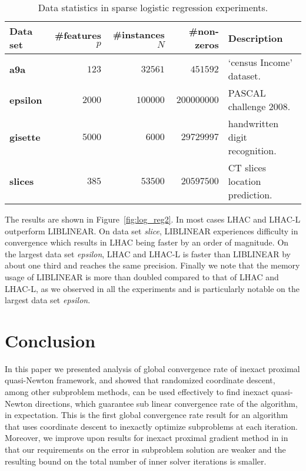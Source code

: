 \documentclass[11pt]{article}
\numberwithin{equation}{section}
\begin{document}
\begin{table}[h!]
\begin{center}
\begin{tabular}{|l|r|r|r|p{5cm}|}
    \hline
              \textbf{Data set}    & \#features $p$ & \#instances $N$ & \#non-zeros & Description \\
    \hline
        \textbf{a9a} &  $123$ & $32561$ & $451592$   & `census Income' dataset. \\
    \hline        
        \textbf{epsilon} &  $2000$ & $100000$ & $200000000$   &  PASCAL challenge 2008. \\
    \hline    
        \textbf{gisette} &  $5000$ & $6000$ & $29729997$  & handwritten digit recognition. \\
    \hline        
        \textbf{slices} &  $385$ & $53500$ & $20597500$   &  CT slices location prediction.\\   
    \hline
\end{tabular}
\end{center}
\caption{ Data statistics in sparse logistic regression experiments. }
\label{tab:Data_statistics}
\end{table}


The results are shown in Figure~\ref{fig:log_reg2}. In most cases LHAC and LHAC-L outperform LIBLINEAR. 
On data set \emph{slice}, LIBLINEAR experiences difficulty in convergence which results in LHAC being faster by an order of magnitude.  
On the largest data set \emph{epsilon}, LHAC and LHAC-L is faster than LIBLINEAR by about one third and reaches the same precision. Finally we note that the memory usage of LIBLINEAR is more than doubled compared to that of LHAC and LHAC-L, as we observed in all the experiments and is particularly notable on  the largest data set \emph{epsilon}.



\section{Conclusion} In this paper we presented analysis of global convergence rate of inexact proximal quasi-Newton framework, and showed that randomized coordinate descent, among other subproblem methods,  can be used effectively to find inexact quasi-Newton directions, which guarantee sub linear convergence rate of the algorithm, in expectation. This is the first global convergence rate result for an algorithm that uses coordinate descent to inexactly optimize subproblems at each iteration. Moreover, we improve upon results for inexact proximal gradient method in \cite{Schmidtetal} in that our requirements on the error in subproblem solution are 
weaker and the resulting bound on the total number of inner solver iterations is smaller. 
\end{document}
